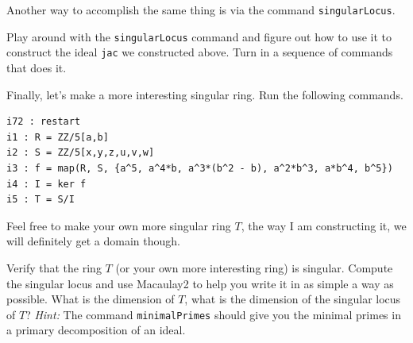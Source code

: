 \documentclass[12pt]{amsart}
\numberwithin{equation}{theorem}
\renewcommand{\:}{\colon}
\begin{document}
Another way to accomplish the same thing is via the command {\tt singularLocus}.

\begin{exercise*}
Play around with the {\tt singularLocus} command and figure out how to use it to construct the ideal {\tt jac} we constructed above.  Turn in a sequence of commands that does it.
\end{exercise*}

Finally, let's make a more interesting singular ring.  Run the following commands.

\begin{verbatim}
i72 : restart
i1 : R = ZZ/5[a,b]
i2 : S = ZZ/5[x,y,z,u,v,w]
i3 : f = map(R, S, {a^5, a^4*b, a^3*(b^2 - b), a^2*b^3, a*b^4, b^5})
i4 : I = ker f
i5 : T = S/I
\end{verbatim}
Feel free to make your own more singular ring $T$, the way I am constructing it, we will definitely get a domain though.

\begin{exercise*}
Verify that the ring $T$ (or your own more interesting ring) is singular.  Compute the singular locus and use Macaulay2 to help you write it in as simple a way as possible.  What is the dimension of $T$, what is the dimension of the singular locus of $T$?
\vskip 3pt
\emph{Hint:} The command {\tt minimalPrimes} should give you the minimal primes in a primary decomposition of an ideal.
\end{exercise*}
\end{document}

